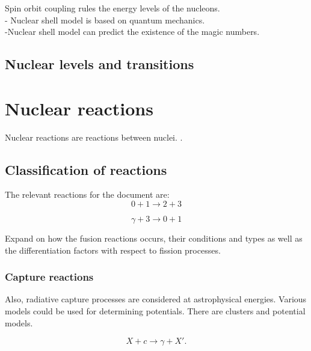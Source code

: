 \documentclass[openany]{book}
\begin{document}
Spin orbit coupling rules the energy levels of the nucleons.  \\

- Nuclear shell model is based on quantum mechanics. \\
-Nuclear shell model can predict the existence of the magic numbers.




\subsection{Nuclear levels and transitions}  \label{sub:nuclearLevelsTransitions}


\section{Nuclear reactions} \label{sec:nuclearReactions}

Nuclear reactions are reactions between nuclei.  \cite{bertulani_2003}. 



\subsection{Classification of reactions} \label{sub:classificationReactions}

The relevant reactions for the document are:
\begin{equation} \label{eq:nuclearReaction_general}
	0 + 1 \rightarrow 2 + 3
\end{equation}

\begin{equation} \label{eq:nuclearReaction_gammaCapture}
	\gamma + 3 \rightarrow 0 + 1
\end{equation}

Expand  on how the fusion reactions occurs, their conditions and types as well as the differentiation factors with respect to fission processes.

\subsubsection{Capture reactions} \label{ssub:captureReactions}

Also, radiative capture processes are considered at astrophysical energies. Various models could be used for determining potentials. There are clusters and potential models.

\begin{equation}  \label{eq:nuclearReaction_capture}
	X + c \rightarrow  \gamma + X'.
\end{equation}
\end{document}
